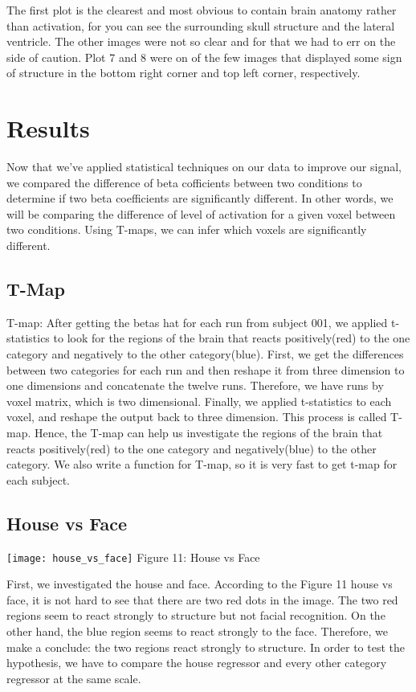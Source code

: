 \documentclass[12pt]{article}
\begin{document}
The first plot is the clearest and most obvious to contain brain anatomy rather 
than activation, for you can see the surrounding skull structure and the 
lateral ventricle. The other images were not so clear and for that we had to 
err on the side of caution. Plot 7 and 8 were on of the few images that 
displayed some sign of structure in the bottom right corner and top left 
corner, respectively.

\section{Results}

Now that we've applied statistical techniques on our data to improve our signal, we compared the difference of beta cofficients between two conditions to determine if two beta coefficients are significantly different. In other words, we will be comparing the difference of level of activation for a given voxel between two conditions. Using T-maps, we can infer which voxels are significantly different.

\subsection{T-Map}

T-map:
After getting the betas hat for each run from subject 001, we applied t-statistics to look for the regions of the brain that reacts positively(red) to the one category and negatively to the other category(blue). First, we get the differences between two categories for each run and then reshape it from three dimension to one dimensions and concatenate the twelve runs. Therefore, we have runs by voxel matrix, which is two dimensional.  Finally, we applied t-statistics to each voxel, and reshape the output back to three dimension. This process is called T-map.  Hence, the T-map can help us investigate the regions of the brain that reacts positively(red) to the one category and negatively(blue) to the other category. We also write a function for T-map, so it is very fast to get t-map for  each subject.


\subsection{House vs Face}

    \centering
      \texttt{[image: house\_vs\_face]}
Figure 11: House vs Face


First, we investigated the house and face. 
According to the Figure 11 house vs face, it is not hard to see that there are two red dots in the image. The two red regions  seem to react strongly to structure but not facial recognition. On the other hand, the blue region seems to react strongly to the face.  Therefore, we make a conclude: the two regions react strongly to structure. In order to test the hypothesis, we have to compare the house regressor and every other category regressor at the same scale.
\end{document}
